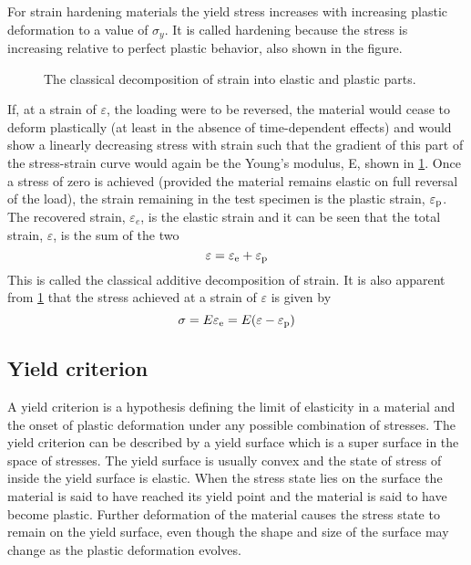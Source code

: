 For strain hardening materials the yield stress increases with increasing plastic deformation to a value of $\sigma_y$.
It is called hardening because the stress is increasing relative to perfect plastic behavior, also shown in the figure.
\begin{figure}[!htp]
\centering{}
\caption{The classical decomposition of strain into elastic and plastic parts.}
\label{Fig:Strain_decomposition}
\end{figure}
If, at a strain of $\varepsilon$, the loading were to be reversed, the material would cease to deform plastically (at least in the absence of time-dependent effects) and would show a linearly decreasing stress with strain such that the gradient of this part of the stress-strain curve would again be the Young's modulus, E, shown in \ref{Fig:Strain_decomposition}.
Once a stress of zero is achieved (provided the material remains elastic on full reversal of the load), the strain remaining in the test specimen is the plastic strain, $\varepsilon_{\rm{p}}$.
The recovered strain, $\varepsilon_e$, is the elastic strain and it can be seen that the total strain, $\varepsilon$, is the sum of the two
\begin{equation}
\varepsilon = \varepsilon_{\rm{e}} + \varepsilon_{\rm{p}}
\end{equation}
This is called the classical additive decomposition of strain.
It is also apparent from \ref{Fig:Strain_decomposition} that the stress achieved at a strain of $\varepsilon$ is given by
\begin{equation}
\sigma = E\varepsilon_{\rm{e}} = E(\varepsilon - \varepsilon_{\rm{p}})
\end{equation}

\subsection{Yield criterion}
\noindent
A yield criterion is a hypothesis defining the limit of elasticity in a material and the onset of plastic deformation under any possible combination of stresses.
The yield criterion can be described by a yield surface which is a super surface in the space of stresses.
The yield surface is usually convex and the state of stress of inside the yield surface is elastic.
When the stress state lies on the surface the material is said to have reached its yield point and the material is said to have become plastic.
Further deformation of the material causes the stress state to remain on the yield surface, even though the shape and size of the surface may change as the plastic deformation evolves.

